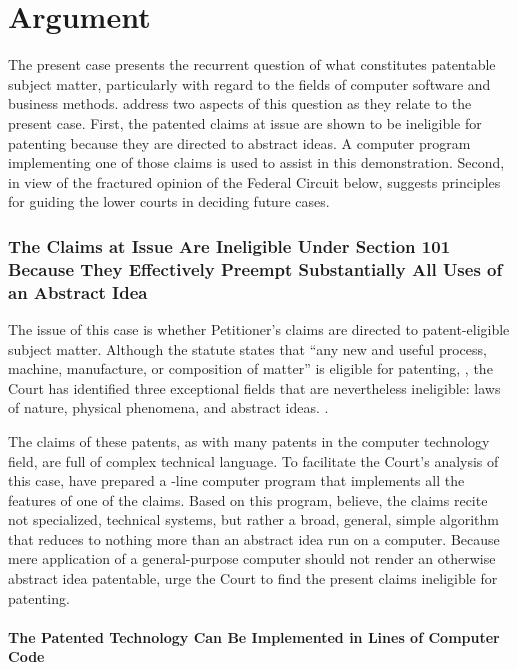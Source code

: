 \documentclass{scotus}
\begin{document}
\part{Argument}

The present case presents the recurrent question of what constitutes patentable
subject matter, particularly with regard to the fields of computer software and
business methods. \Amici address two aspects of this question as they relate to
the present case. First, the patented claims at issue are shown to be ineligible
for patenting because they are directed to abstract ideas. A computer program
implementing one of those claims is used to assist in this demonstration.
Second, in view of the fractured opinion of the Federal Circuit below, \amici
suggests principles for guiding the lower courts in deciding future cases.

\section{The Claims at Issue Are Ineligible Under Section 101 Because They
Effectively Preempt Substantially All Uses of an Abstract Idea}

The issue of this case is whether Petitioner's claims are directed to
patent-eligible subject matter. Although the statute states that ``any new and
useful process, machine, manufacture, or composition of matter'' is eligible for
patenting, , the Court has identified three exceptional fields that
are nevertheless ineligible: laws of nature, physical phenomena, and abstract
ideas. .

The claims of these patents, as with many patents in the computer technology
field, are full of complex technical language. To facilitate the Court's
analysis of this case, \amici have prepared a \numlines-line computer program
that implements all the features of one of the claims. Based on this program,
\amici believe, the claims recite not specialized, technical systems, but
rather a broad, general, simple algorithm that reduces to nothing more than an
abstract idea run on a computer. Because mere application of a general-purpose
computer should not render an otherwise abstract idea patentable, \amici
urge the Court to find the present claims ineligible for patenting.

\subsection{The Patented Technology Can Be Implemented in \Numlines Lines of
Computer Code}
\end{document}
